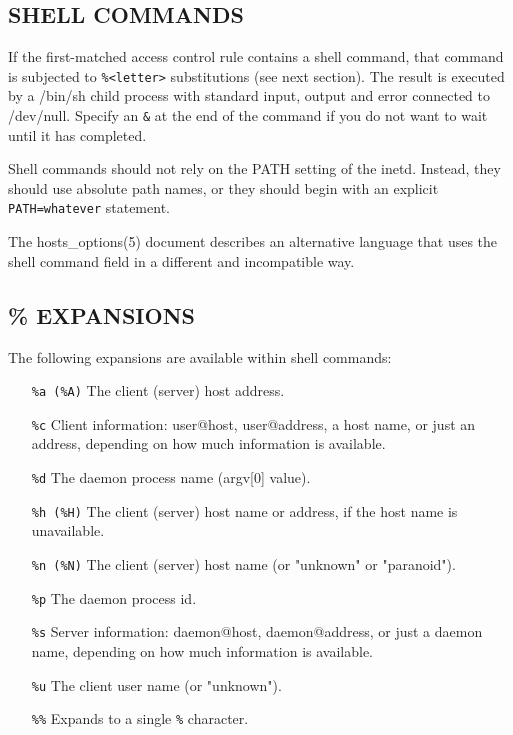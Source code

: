 \documentclass[11pt,twoside,a4paper]{book}
\newcommand{\dsc}{\discretionary{}{}{}}
\begin{document}
\subsection*{SHELL COMMANDS}

If the first-matched access control rule contains a shell command,
that command is subjected to \texttt{\%<letter>} substitutions (see
next section).  The result is executed by a /bin/sh child process with
standard input, output and error connected to /dev/null.  Specify an
\texttt{\&} at the end of the command if you do not want to wait until
it has completed.

Shell commands should not rely on the PATH setting of the inetd.
Instead, they should use absolute path names, or they should begin
with an explicit \texttt{PATH=\dsc{}whatever} statement.

The hosts\_options(5) document describes an alternative language that
uses the shell command field in a different and incompatible way.

\subsection*{\% EXPANSIONS}

The following expansions are available within shell commands:

\begin{itemize}

\item[\tt \%a (\%A)] The client (server) host address.
\item[\tt \%c] Client information: user@host, user@address, a host
name, or just an address, depending on how much information is
available.
\item[\tt \%d] The daemon process name (argv[0] value).
\item[\tt \%h (\%H)]
The client (server) host name or address, if the host name is
unavailable.
\item[\tt \%n (\%N)] The client (server) host name (or "unknown" or
"paranoid").
\item[\tt \%p] The daemon process id.
\item[\tt \%s] Server information: daemon@host, daemon@address, or
just a daemon name, depending on how much information is available.
\item [\tt \%u] The client user name (or "unknown").
\item [\tt \%\%] Expands to a single \texttt{\%} character.

\end{itemize}
\end{document}
